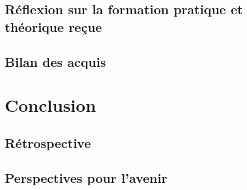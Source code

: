 \documentclass[12pt]{article} 	%
\begin{document}
\subsection{Réflexion sur la formation pratique et théorique reçue} %




\subsection{Bilan des acquis}


\newpage
\section{Conclusion}

\subsection{Rétrospective}

\subsection{Perspectives pour l’avenir} 
\end{document}
